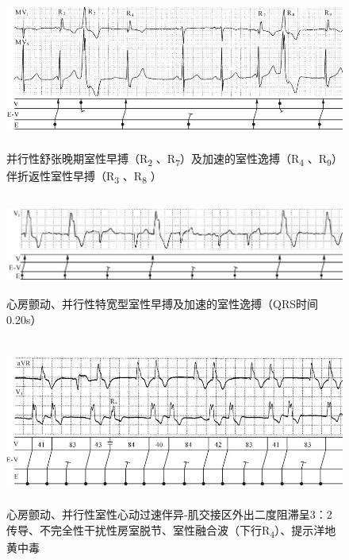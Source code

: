 \begin{figure}[!htbp]
 \centering
 \includegraphics[width=5.69792in,height=2.07292in]{./images/Image00286.jpg}
 \captionsetup{justification=centering}
 \caption{并行性舒张晚期室性早搏（R\textsubscript{2} 、R\textsubscript{7}）及加速的室性逸搏（R\textsubscript{4} 、R\textsubscript{9}）伴折返性室性早搏（R\textsubscript{3} 、R\textsubscript{8} ）}
 \label{fig16-10}
  \end{figure} 


\begin{figure}[!htbp]
 \centering
 \includegraphics[width=5.83333in,height=1.26042in]{./images/Image00287.jpg}
 \captionsetup{justification=centering}
 \caption{心房颤动、并行性特宽型室性早搏及加速的室性逸搏（QRS时间0.20s）}
 \label{fig16-11}
  \end{figure} 

\begin{figure}[!htbp]
 \centering
 \includegraphics[width=5.69792in,height=2.15625in]{./images/Image00288.jpg}
 \captionsetup{justification=centering}
 \caption{心房颤动、并行性室性心动过速伴异-肌交接区外出二度阻滞呈3：2传导、不完全性干扰性房室脱节、室性融合波（下行R\textsubscript{4}）、提示洋地黄中毒}
 \label{fig16-12}
  \end{figure} 


